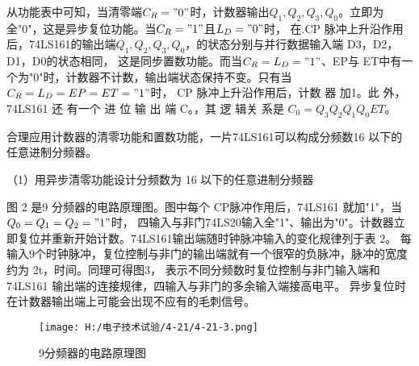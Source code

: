 \documentclass{article}
\begin{document}
            从功能表中可知，当清零端$ C_R="0"$时，计数器输出$Q_1,Q_2,Q_3,Q_0$。立即为全"0"，这是异步复位功能。当$ C_R="1"$且$L_D="0"$时，
            在.CP 脉冲上升沿作用后，74LS161的输出端$Q_1,Q_2,Q_3,Q_0$，的状态分别与并行数据输入端 D3，D2，D1，D0的状态相同，
            这是同步置数功能。而当$ C_R=L_D="1"$、EP与 ET中有一个为"0"时，计数器不计数，输出端状态保持不变。只有当$ C_R=L_D=EP=ET="1"$时，
            CP 脉冲上升沿作用后，计数 器 加1。此 外，74LS161 还 有一个 进 位 输 出 端 C。，其 逻 辑关 系是 $ C_0=Q_3Q_2Q_1Q_0ET$。\par
            合理应用计数器的清零功能和置数功能，一片74LS161可以构成分频数16 以下的任意进制分频器。\par 
            （1）用异步清零功能设计分频数为 16 以下的任意进制分频器\par 
            图 2 是9 分频器的电路原理图。图中每个 CP脉冲作用后，74LS161 就加"1"，当$Q_0=Q_1=Q_2="1"$时，
            四输入与非门74LS20输入全"1"、输出为"0"。计数器立即复位并重新开始计数。74LS161输出端随时钟脉冲输入的变化规律列于表 2。
            每输入9个时钟脉冲，复位控制与非门的输出端就有一个很窄的负脉冲，脉冲的宽度约为 2t，时间。同理可得图3，
            表示不同分频数时复位控制与非门输入端和74LS161 输出端的连接规律，四输入与非门的多余输入端接高电平。
            异步复位时在计数器输出端上可能会出现不应有的毛刺信号。
            \begin{figure}[h]
                \centering
                \texttt{[image: H:/电子技术试验/4-21/4-21-3.png]}
                \caption{9分频器的电路原理图} \label{fig:aa}
                \end{figure}
    
\end{document}
